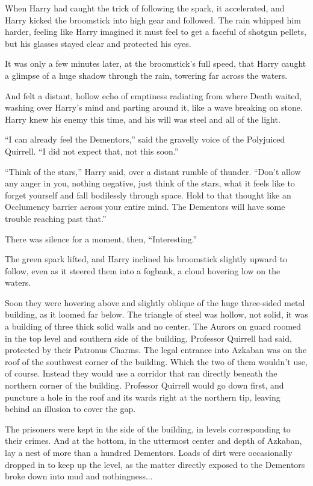 When Harry had caught the trick of following the spark, it accelerated, and Harry kicked the broomstick into high gear and followed. The rain whipped him harder, feeling like Harry imagined it must feel to get a faceful of shotgun pellets, but his glasses stayed clear and protected his eyes.

It was only a few minutes later, at the broomstick's full speed, that Harry caught a glimpse of a huge shadow through the rain, towering far across the waters.

And felt a distant, hollow echo of emptiness radiating from where Death waited, washing over Harry's mind and parting around it, like a wave breaking on stone. Harry knew his enemy this time, and his will was steel and all of the light.

``I can already feel the Dementors,'' said the gravelly voice of the Polyjuiced Quirrell. ``I did not expect that, not this soon.''

``Think of the stars,'' Harry said, over a distant rumble of thunder. ``Don't allow any anger in you, nothing negative, just think of the stars, what it feels like to forget yourself and fall bodilessly through space. Hold to that thought like an Occlumency barrier across your entire mind. The Dementors will have some trouble reaching past that.''

There was silence for a moment, then, ``Interesting.''

The green spark lifted, and Harry inclined his broomstick slightly upward to follow, even as it steered them into a fogbank, a cloud hovering low on the waters.

Soon they were hovering above and slightly oblique of the huge three-sided metal building, as it loomed far below. The triangle of steel was hollow, not solid, it was a building of three thick solid walls and no center. The Aurors on guard roomed in the top level and southern side of the building, Professor Quirrell had said, protected by their Patronus Charms. The legal entrance into Azkaban was on the roof of the southwest corner of the building. Which the two of them wouldn't use, of course. Instead they would use a corridor that ran directly beneath the northern corner of the building. Professor Quirrell would go down first, and puncture a hole in the roof and its wards right at the northern tip, leaving behind an illusion to cover the gap.

The prisoners were kept in the side of the building, in levels corresponding to their crimes. And at the bottom, in the uttermost center and depth of Azkaban, lay a nest of more than a hundred Dementors. Loads of dirt were occasionally dropped in to keep up the level, as the matter directly exposed to the Dementors broke down into mud and nothingness...

